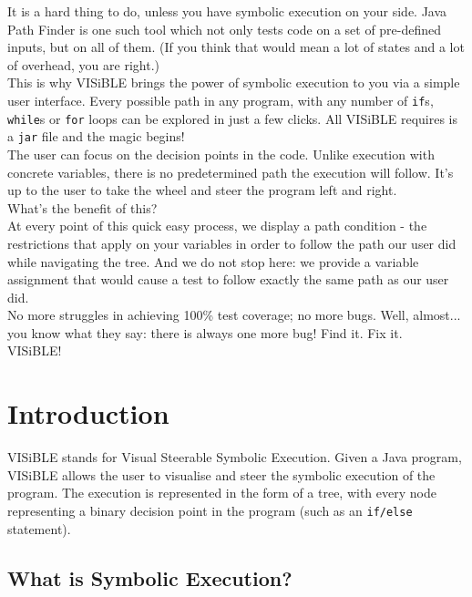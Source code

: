 \documentclass[titlepage,11pt]{article}
\begin{document}
It is a hard thing to do, unless you have symbolic execution on your side. Java Path Finder is one such tool which not only tests code on
a set of pre-defined inputs, but on all of them. (If you think that would mean a lot of states and a lot of overhead, you are right.) \\

This is why VISiBLE brings the power of symbolic execution to you via a simple user interface. Every possible path in any program, with any number
of \texttt{if}s, \texttt{while}s or \texttt{for} loops can be explored in just a few clicks. All VISiBLE requires is a \texttt{jar} file and the magic begins! \\

The user can focus on the decision points in the code. Unlike execution with concrete variables, there is no predetermined path the execution will follow.
It's up to the user to take the wheel and steer the program left and right. \\

What’s the benefit of this? \\

At every point of this quick easy process, we display a path condition - the restrictions that apply on your variables in order to follow the path our user did while navigating the tree. And we do not stop here: we provide a variable assignment that would cause a test to follow exactly the same path
as our user did. \\

No more struggles in achieving 100\% test coverage; no more bugs. Well, almost... you know what they say: there is always one more bug! Find it. Fix it. \\

VISiBLE!

\tableofcontents

\section{Introduction}
\setcounter{page}{1}
VISiBLE stands for Visual Steerable Symbolic Execution. Given a Java program, VISiBLE allows the user to visualise and steer the symbolic execution of the program. The execution is represented in the form of a tree, with every node representing a binary decision point in the program (such as an \texttt{if/else} statement).

\subsection{What is Symbolic Execution?}
\end{document}
